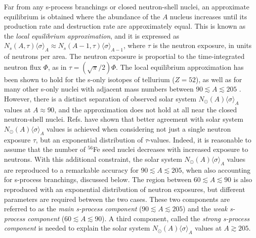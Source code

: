 Far from any s-process branchings or closed neutron-shell nuclei, an approximate equilibrium is obtained where the abundance of the $A$ nucleus increases until its production rate and destruction rate are approximately equal. This is known as the \emph{local equilibrium approximation}, and it is expressed as $N_{s}(A,\tau)\langle \sigma \rangle_{A} \approx N_{s}(A-1,\tau)\langle \sigma \rangle_{A-1}$, where $\tau$ is the neutron exposure, in units of neutrons per area. The neutron exposure is proportial to the time-integrated neutron flux $\Phi$, as in $\tau = (\sqrt{\pi}/2) \Phi$. The local equilibrium approximation has been shown to hold for the s-only isotopes of tellurium ($Z=52$), as well as for many other s-only nuclei with adjacent mass numbers between $90 \lesssim A \lesssim 205$ \cite{Iliadis2015}. However, there is a distinct separation of observed solar system $N_{\odot}(A)\langle \sigma \rangle_{A}$ values at $A \approx 90$, and the approximation does not hold at all near the closed neutron-shell nuclei. Refs. \cite{Clayton1961,Seeger1965} have shown that better agreement with solar system $N_{\odot}(A)\langle \sigma \rangle_{A}$ values is achieved when considering not just a single neutron exposure $\tau$, but an exponential distribution of $\tau$-values. Indeed, it is reasonable to assume that the number of $^{56}$Fe seed nuclei decreases with increased exposure to neutrons. With this additional constraint, the solar system $N_{\odot}(A)\langle \sigma \rangle_{A}$ values are reproduced to a remarkable accuracy for $90 \lesssim A \lesssim 205$, when also accounting for s-process branchings, discussed below. The region between $60 \lesssim A \lesssim 90$ is also reproduced with an exponential distribution of neutron exposures, but different parameters are required between the two cases. These two components are referred to as the \emph{main s-process component} ($90 \lesssim A \lesssim 205$) and the \emph{weak s-process component} ($60 \lesssim A \lesssim 90$). A third component, called the \emph{strong s-process component} is needed to explain the solar system $N_{\odot}(A)\langle \sigma \rangle_{A}$ values at $A \gtrsim 205$. 



